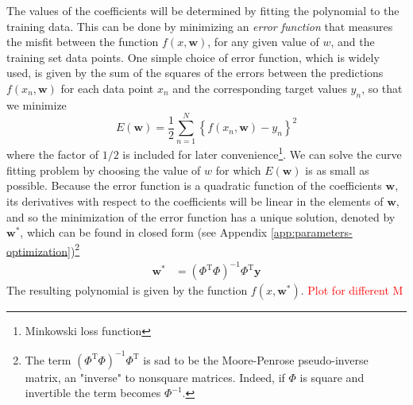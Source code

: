\documentclass{article} %
\begin{document}
The values of the coefficients will be determined by fitting the polynomial to the training data. This can be done by minimizing an \textit{error function} that measures the misfit between the function $f(x, \mathbf{w})$, for any given value of $w$, and the training set data points. One simple choice of error function, which is widely used, is given by the sum of the squares of the errors between the predictions $f(x_n, \mathbf{w})$ for each data point $x_n$ and the corresponding target values $y_n$, so that we minimize
%
\begin{equation}
      E(\mathbf{w})=\frac{1}{2} \sum_{n=1}^{N}\left\{f\left(x_{n}, \mathbf{w}\right)-y_{n}\right\}^{2}
\end{equation}
%
where the factor of $1/2$ is included for later convenience\footnote{Minkowski loss function}. We can solve the curve fitting problem by choosing the value of $w$ for which $E(\mathbf{w})$ is as small as possible. Because the error function is a quadratic function of the coefficients $\mathbf{w}$, its derivatives with respect to the coefficients will be linear in the elements of $\mathbf{w}$, and so the minimization of the error function has a unique solution, denoted by $\mathbf{w}^*$, which can be found in closed form (see Appendix \ref{app:parameters-optimization})\footnote{The term $ \left( \Phi^{\mathrm{T}} \Phi \right)^{-1}\Phi^{\mathrm{T}}$ is sad to be the Moore-Penrose pseudo-inverse matrix, an "inverse" to nonsquare matrices. Indeed, if $\Phi$ is square and invertible the term becomes $\Phi^{-1}$.}
%
\begin{align}
      \mathbf{w}^* &= \left( \Phi^{\mathrm{T}} \Phi \right)^{-1}\Phi^{\mathrm{T}} \mathbf{y}
\end{align}
%
The resulting polynomial is given by the function $f(x,\mathbf{w}^*)$.
\textcolor{red}{Plot for different M}
\end{document}
